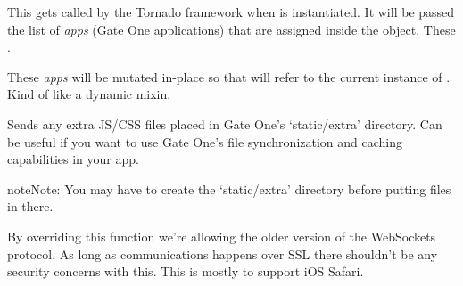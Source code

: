 \documentclass[letterpaper,10pt,openany]{sphinxmanual}
\begin{document}
\begin{fulllineitems}

\begin{fulllineitems}
\label{Developer/server:gateone.core.server.ApplicationWebSocket.initialize}
This gets called by the Tornado framework when {\hyperref[Developer/server:gateone.core.server.ApplicationWebSocket]{}} is
instantiated.  It will be passed the list of \emph{apps} (Gate One
applications) that are assigned inside the {\hyperref[Developer/server:gateone.core.server.GOApplication]{}}
object.  These .

These \emph{apps} will be mutated in-place so that  will refer to the
current instance of {\hyperref[Developer/server:gateone.core.server.ApplicationWebSocket]{}}.  Kind of like a
dynamic mixin.

\end{fulllineitems}


\begin{fulllineitems}
\label{Developer/server:gateone.core.server.ApplicationWebSocket.send_extra}
Sends any extra JS/CSS files placed in Gate One's `static/extra'
directory.  Can be useful if you want to use Gate One's file
synchronization and caching capabilities in your app.

\begin{notice}{note}{Note:}
You may have to create the `static/extra' directory before putting
files in there.
\end{notice}

\end{fulllineitems}


\begin{fulllineitems}
\label{Developer/server:gateone.core.server.ApplicationWebSocket.allow_draft76}
By overriding this function we're allowing the older version of the
WebSockets protocol.  As long as communications happens over SSL there
shouldn't be any security concerns with this.  This is mostly to support
iOS Safari.


\end{fulllineitems}
\end{fulllineitems}
\end{document}

